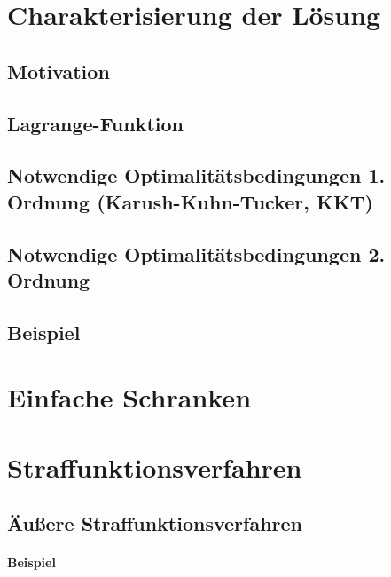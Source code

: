 	\section{Charakterisierung der Lösung} %

		\subsection{Motivation} %

		\subsection{Lagrange-Funktion} %

		\subsection{Notwendige Optimalitätsbedingungen 1. Ordnung (Karush-Kuhn-Tucker, KKT)} %

		\subsection{Notwendige Optimalitätsbedingungen 2. Ordnung} %

		\subsection{Beispiel} %

	\section{Einfache Schranken} %

	\section{Straffunktionsverfahren} %

		\subsection{Äußere Straffunktionsverfahren} %

			\paragraph{Beispiel} %

